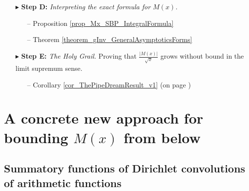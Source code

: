 \documentclass[11pt,reqno,a4letter]{article}
\numberwithin{figure}{section}
\numberwithin{table}{section}
\theoremstyle{plain}
\numberwithin{theorem}{section}
\theoremstyle{definition}
\begin{document}
\begin{itemize}[noitemsep,topsep=0pt,leftmargin=0.95in]
\item[$\blacktriangleright$ \textbf{Step D:}] \textit{Interpreting the exact formula for $M(x)$. } 
     \begin{itemize}[noitemsep,topsep=0pt,leftmargin=0.35in]
     \item[--] \small{Proposition \ref{prop_Mx_SBP_IntegralFormula}} 
     \item[--] \small{Theorem \ref{theorem_gInv_GeneralAsymptoticsForms}} 
     \end{itemize} 
\item[$\blacktriangleright$ \textbf{Step E:}] \textit{The Holy Grail. } 
     Proving that 
     $\frac{|M(x)|}{\sqrt{x}}$ grows without bound in the limit supremum sense. 
     \begin{itemize}[noitemsep,topsep=0pt,leftmargin=0.35in]
     \item[--] \small{Corollary \ref{cor_ThePipeDreamResult_v1} (on page \pageref{proofOf_cor_ThePipeDreamResult_v1})} 
     \end{itemize} 

\end{itemize} 

\newpage 
\section{A concrete new approach for bounding $M(x)$ from below} 

\subsection{Summatory functions of Dirichlet convolutions of arithmetic functions} 
\end{document}
